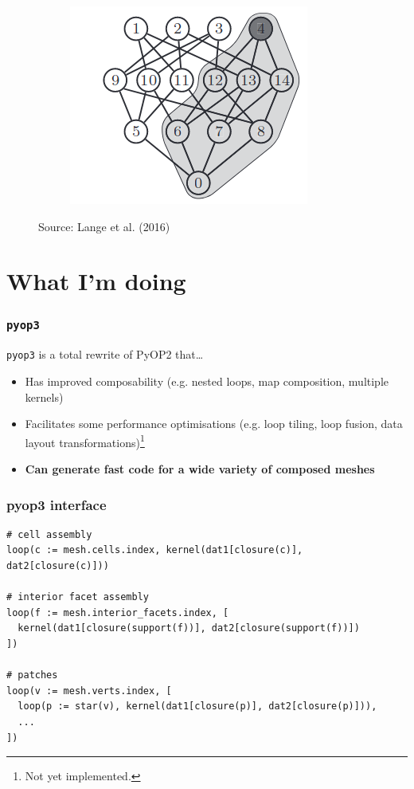 \documentclass{beamer}
\begin{document}
\begin{frame}
\begin{figure}
\begin{subfigure}[b]{0.3\textwidth}
      \includegraphics[width=\textwidth]{star}
    \end{subfigure}
    \caption{Source: Lange et al. (2016)}
  \end{figure}
\end{frame}

\section{What I'm doing}

\begin{frame}
  \frametitle{\texttt{pyop3}}

  \texttt{pyop3} is a total rewrite of PyOP2 that\dots

  \begin{itemize}
    \item Has improved composability (e.g. nested loops, map composition, multiple kernels)
    \item Facilitates some performance optimisations (e.g. loop tiling, loop fusion, data layout transformations)\footnote{Not yet implemented.}
    \item \textbf{Can generate fast code for a wide variety of composed meshes}
  \end{itemize}
\end{frame}

\begin{frame}[containsverbatim]
  \frametitle{pyop3 interface}

  \tiny
  \begin{verbatim}
# cell assembly
loop(c := mesh.cells.index, kernel(dat1[closure(c)], dat2[closure(c)]))

# interior facet assembly
loop(f := mesh.interior_facets.index, [
  kernel(dat1[closure(support(f))], dat2[closure(support(f))])
])

# patches
loop(v := mesh.verts.index, [
  loop(p := star(v), kernel(dat1[closure(p)], dat2[closure(p)])),
  ...
])
  \end{verbatim}
\end{frame}
\end{document}
